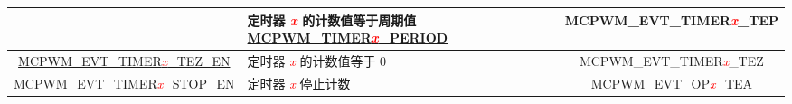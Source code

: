 \begin{ThreePartTable}
\begin{longtable}[c]{| c | C{7cm} | c |}
    & 定时器 \textcolor{red}{\it{x}} 的计数值等于周期值 \hyperref[fielddesc:MCPWMTIMER0PERIOD]{MCPWM\_TIMER\textcolor{red}{\it{x}}\_PERIOD}
    & MCPWM\_EVT\_TIMER\textcolor{red}{\it{x}}\_TEP    \\\hline
    \hyperref[fielddesc:MCPWMEVTTIMER0TEZEN]{MCPWM\_EVT\_TIMER\textcolor{red}{\it{x}}\_TEZ\_EN}
    & 定时器 \textcolor{red}{\it{x}} 的计数值等于 0
    & MCPWM\_EVT\_TIMER\textcolor{red}{\it{x}}\_TEZ    \\\hline
    \hyperref[fielddesc:MCPWMEVTTIMER0STOPEN]{MCPWM\_EVT\_TIMER\textcolor{red}{\it{x}}\_STOP\_EN}
    & 定时器 \textcolor{red}{\it{x}} 停止计数
    & MCPWM\_EVT\_OP\textcolor{red}{\it{x}}\_TEA   \\\hline
\end{longtable}
\end{ThreePartTable}